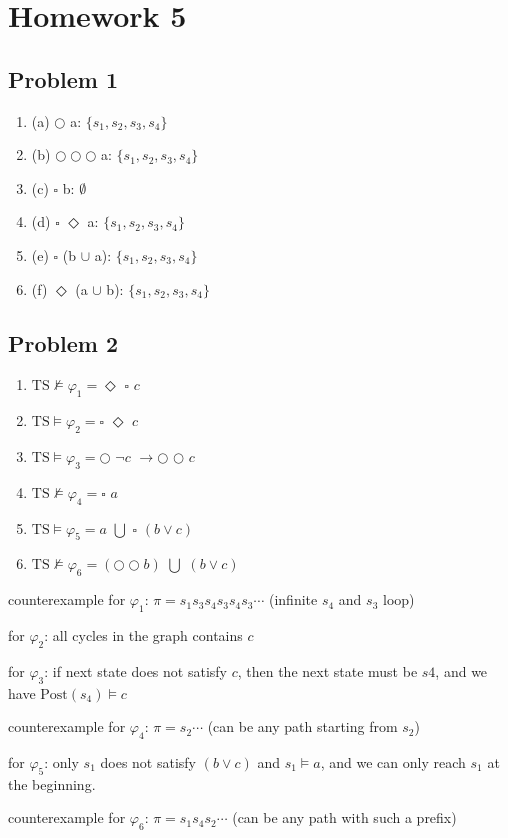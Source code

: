 \chapter{Homework 5}

\section{Problem 1}

\begin{enumerate}
    \item (a) $\bigcirc$ a: $\{s_1, s_2, s_3, s_4\}$
    \item (b) $\bigcirc \bigcirc \bigcirc$ a: $\{s_1, s_2, s_3, s_4\}$
    \item (c) $\square$ b: $\emptyset$
    \item (d) $\square$ $\Diamond$ a: $\{s_1, s_2, s_3, s_4\}$
    \item (e) $\square$ (b $\cup$  a): $\{s_1, s_2, s_3, s_4\}$
    \item (f) $\Diamond$ (a $\cup$ b): $\{s_1, s_2, s_3, s_4\}$
\end{enumerate}

\section{Problem 2}

\newcommand{\TS}{\text{TS}}

\begin{enumerate}
    \item $\TS \not \models \varphi_1 = \Diamond$ $\square$ $c$
    \item $\TS \models \varphi_2 = \square$ $\Diamond$ $c$
    \item $\TS \models \varphi_3 = \bigcirc$ $\neg c$ $\rightarrow \bigcirc$ $ \bigcirc$ $c$
    \item $\TS \not \models \varphi_4 = \square$ $a$
    \item $\TS \models \varphi_5 = a$ $\bigcup$ $\square$ $(b \vee c)$
    \item $\TS \not \models \varphi_6 = (\bigcirc \bigcirc b)$ $\bigcup$ $(b \vee c)$
\end{enumerate}

counterexample for $\varphi_1$: $\pi = s_1 s_3 s_4 s_3 s_4 s_3 \cdots$  (infinite $s_4$ and $s_3$ loop)

for $\varphi_2$: all cycles in the graph contains $c$

for $\varphi_3$: if next state does not satisfy $c$, then the next state must be $s4$,
and we have $\text{Post}(s_4) \models c$

counterexample for $\varphi_4$: $\pi = s_2 \cdots$ (can be any path starting from $s_2$)

for $\varphi_5$: only $s_1$ does not satisfy $(b \vee c)$ and $s_1 \models a$, and we can only reach
$s_1$ at the beginning.

counterexample for $\varphi_6$: $\pi = s_1 s_4 s_2 \cdots$ (can be any path with such a prefix)
